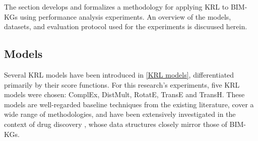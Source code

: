 The section develops and formalizes a methodology for applying \ac{KRL} to \acp{BIM-KG} using performance analysis experiments. An overview of the models, datasets, and evaluation protocol used for the experiments is discuused herein.

\subsection{Models}
Several \ac{KRL} models have been introduced in \autoref{KRL models}, differentiated primarily by their score functions. For this research's experiments, five \ac{KRL} models were chosen: ComplEx, DistMult, RotatE, TransE and TransH. These models are well-regarded baseline techniques from the existing literature, cover a wide range of methodologies, and have been extensively investigated in the context of drug discovery \citep{Paliwal2020PreclinicalGraphs, Zheng2021PharmKG:Mining}, whose data structures closely mirror those of \acp{BIM-KG}.

